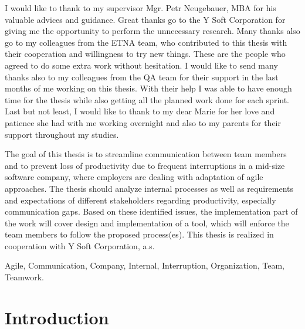 \documentclass[11pt,singleside]{myfithesis2}
\begin{document}
\FrontMatter
\ThesisTitlePage
\begin{ThesisDeclaration}
\DeclarationText
\AdvisorName
\end{ThesisDeclaration}
\begin{ThesisThanks}
I would like to thank to my supervisor Mgr. Petr Neugebauer, MBA for his valuable advices and guidance. Great thanks go to the Y Soft Corporation for giving me the opportunity to perform the unnecessary research. Many thanks also go to my colleagues from the ETNA team, who contributed to this thesis with their cooperation and willingness to try new things. These are the people who agreed to do some extra work without hesitation. I would like to send many thanks also to my colleagues from the QA team for their support in the last months of me working on this thesis. With their help I was able to have enough time for the thesis while also getting all the planned work done for each sprint. Last but not least, I would like to thank to my dear Marie for her love and patience she had with me working overnight and also to my parents for their support throughout my studies. 
\end{ThesisThanks}
\begin{ThesisAbstract}
The goal of this thesis is to streamline communication between team members and to prevent loss of productivity due to frequent interruptions in a mid-size software company, where employers are dealing with adaptation of agile approaches. The thesis should analyze internal processes as well as requirements and expectations of different stakeholders regarding productivity, especially communication gaps. Based on these identified issues, the implementation part of the work will cover design and implementation of a tool, which will enforce the team members to follow the proposed process(es). This thesis is realized in cooperation with Y Soft Corporation, a.s.
\end{ThesisAbstract}
\begin{ThesisKeyWords}
Agile, Communication, Company, Internal, Interruption, Organization, Team, Teamwork.
\end{ThesisKeyWords}
\MainMatter
\tableofcontents %

\chapter{Introduction}
\end{document}
